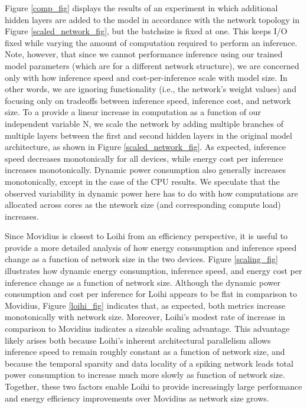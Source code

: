 \documentclass[sigconf, screen]{acmart}
\begin{document}
Figure \ref{comp_fig} displays the results of an experiment in which additional hidden layers are added to the model in accordance with the network topology in Figure \ref{scaled_network_fig}, but the batchsize is fixed at one. This keeps I/O fixed while varying the amount of computation required to perform an inference. Note, however, that since we cannot performance inference using our trained model parameters (which are for a different network structure), we are concerned only with how inference speed and cost-per-inference scale with model size. In other words, we are ignoring functionality (i.e., the network's weight values) and focusing only on tradeoffs between inference speed, inference cost, and network size. To a provide a linear increase in computation as a function of our independent variable N, we scale the network by adding multiple branches of multiple layers between the first and second hidden layers in the original model architecture, as shown in Figure \ref{scaled_network_fig}. As expected, inference speed decreases monotonically for all devices, while energy cost per inference increases monotonically. Dynamic power consumption also generally increases monotonically, except in the case of the CPU results. We speculate that the observed variability in dynamic power here has to do with how computations are allocated across cores as the ntework size (and corresponding compute load) increases.

Since Movidius is closest to Loihi from an efficiency perspective, it is useful to provide a more detailed analysis of how energy consumption and inference speed change as a function of network size in the two devices. Figure \ref{scaling_fig} illustrates how dynamic energy consumption, inference speed, and energy cost per inference change as a function of network size. Although the dynamic power consumption and cost per inference for Loihi appears to be flat in comparison to Movidius, Figure \ref{loihi_fig} indicates that, as expected, both metrics increase monotonically with network size. Moreover, Loihi's modest rate of increase in comparison to Movidius indicates a sizeable scaling advantage. This advantage likely arises both because Loihi's inherent architectural parallelism allows inference speed to remain roughly constant as a function of network size, and because the temporal sparsity and data locality of a spiking network leads total power consumption to increase much more slowly as function of network size. Together, these two factors enable Loihi to provide increasingly large performance and energy efficiency improvements over Movidius as network size grows. 
\end{document}
